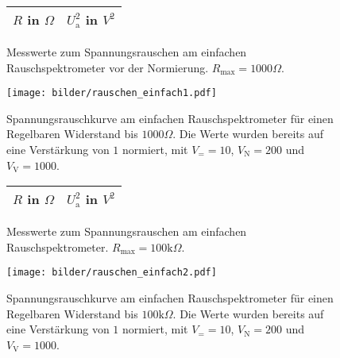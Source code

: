 		
	\begin{figure}[htbp]

	\begin{minipage}{0.3\textwidth} 

			\centering
			\begin{tabular}{cc}
				\toprule \midrule
				$R$ in $\Omega$ & $U_\text{a}^2$ in $V^2$ \\
				\midrule
							
				\midrule \bottomrule
			\end{tabular}
			\caption{Messwerte zum Spannungsrauschen am einfachen 
			Rauschspektrometer vor der Normierung. $R_\text{max}=1000 \Omega$.}
			\label{tab:rauschen_einfach1}

	\end{minipage}
	\hfill
	\begin{minipage}{0.7\textwidth}

			\centering
			\texttt{[image: bilder/rauschen\_einfach1.pdf]}
			\caption{Spannungsrauschkurve am einfachen Rauschspektrometer für einen 
			Regelbaren Widerstand bis $1000\Omega$. Die Werte wurden bereits auf 
			eine Verstärkung von 
			$1$ normiert, mit $V_= =10$, $V_\text{N}=200$ und $V_\text{V}=1000$. }
			\label{fig:rauschen_einfach1}
			
	\end{minipage}
	\end{figure}		
	
	
	
	
		\begin{figure}[htbp]

	\begin{minipage}{0.3\textwidth} 

			\centering
			\begin{tabular}{cc}
				\toprule \midrule
				$R$ in $\Omega$ & $U_\text{a}^2$ in $V^2$ \\
				\midrule
							
				\midrule \bottomrule
			\end{tabular}
			\caption{Messwerte zum Spannungsrauschen am einfachen 
			Rauschspektrometer. $R_\text{max}=100 \text{k}\Omega$.}
			\label{tab:rauschen_einfach2}

	\end{minipage}
	\hfill
	\begin{minipage}{0.7\textwidth}

			\centering
			\texttt{[image: bilder/rauschen\_einfach2.pdf]}
			\caption{Spannungsrauschkurve am einfachen Rauschspektrometer für einen 
			Regelbaren Widerstand bis $100\text{k}\Omega$. Die Werte wurden bereits auf eine 
			Verstärkung von 	$1$ normiert, mit $V_= =10$, $V_\text{N}=200$ und $V_\text{V}=1000$. }
			\label{fig:rauschen_einfach2}
			
	\end{minipage}

	\end{figure}		
		

